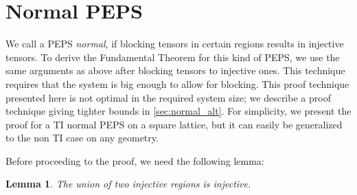\documentclass[preprint, superscriptaddress,a4paper,longbibliography]{revtex4-1}
\newtheorem{lemma}{Lemma}
\theoremstyle{definition}
\begin{document}
\section{Normal PEPS}\label{sec:normal}

We call a PEPS \emph{normal}, if blocking tensors in certain regions results in injective tensors. To derive the Fundamental Theorem for this kind of PEPS, we use the same arguments as above after blocking tensors to injective ones. This technique requires that the system is big enough to allow for blocking. This proof technique presented here is not optimal in the required system size; we describe a proof technique giving tighter bounds in \cref{sec:normal_alt}. For simplicity, we present the proof for a TI normal PEPS on a square lattice, but it can easily be generalized to the non TI case on any geometry.



Before proceeding to the proof, we need the following lemma:

\begin{lemma}\label{lem:injective_union}
    The union of two injective regions is injective.
\end{lemma}
\end{document}
